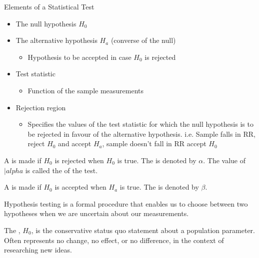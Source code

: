 \documentclass[12pt, a4paper, twoside, openright, titlepage]{book}
\begin{document}
\begin{cust*}{Elements of a Statistical Test}{}
    \leavevmode
    \begin{itemize}
        \item The null hypothesis $H_0$
        \item The alternative hypothesis $H_a$ (converse of the null) \begin{itemize}
                \item Hypothesis to be accepted in case $H_0$ is rejected
        \end{itemize}
        \item Test statistic \begin{itemize}
                \item Function of the sample measurements
        \end{itemize}
        \item Rejection region \begin{itemize}
                \item Specifies the values of the test statistic for which the null hypothesis is to be rejected in favour of the alternative hypothesis. i.e. Sample falls in RR, reject $H_0$ and accept $H_a$, sample doesn't fall in RR accept $H_0$
        \end{itemize}
    \end{itemize}
\end{cust*}


\begin{defn}{}{}
    A  is made if $H_0$ is rejected when $H_0$ is true. The  is denoted by $\alpha$. The value of $|alpha$ is called the  of the test. 


    A  is made if $H_0$ is accepted when $H_a$ is true. The  is denoted by $\beta$.
\end{defn}


\begin{rmk}{}{}
    Hypothesis testing is a formal procedure that enables us to choose between two hypotheses when we are uncertain about our measurements.
\end{rmk}

\begin{defn}{}{}
    The , $H_0$, is the conservative status quo statement about a population parameter. Often represents no change, no effect, or no difference, in the context of researching new ideas.
\end{defn}
\end{document}

